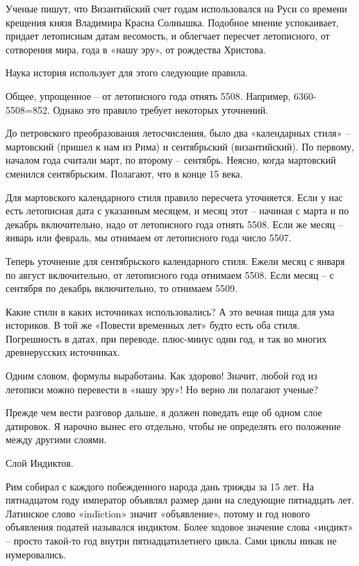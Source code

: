 Ученые пишут, что Византийский счет годам использовался на Руси со времени крещения князя Владимира Красна Солнышка. Подобное мнение успокаивает, придает летописным датам весомость, и облегчает пересчет летописного, от сотворения мира, года в «нашу эру», от рождества Христова.

Наука история использует для этого следующие правила.

Общее, упрощенное – от летописного года отнять 5508. Например, 6360-5508=852. Однако это правило требует некоторых уточнений.

До петровского преобразования летосчисления, было два «календарных стиля» – мартовский (пришел к нам из Рима) и сентябрьский (византийский). По первому, началом года считали март, по второму – сентябрь. Неясно, когда мартовский сменился сентябрьским. Полагают, что в конце 15 века.

Для мартовского календарного стиля правило пересчета уточняется. Если у нас есть летописная дата с указанным месяцем, и месяц этот – начиная с марта и по декабрь включительно, надо от летописного года отнять 5508. Если же месяц – январь или февраль, мы отнимаем от летописного года число 5507.

Теперь уточнение для сентябрьского календарного стиля. Ежели месяц с января по август включительно, от летописного года отнимаем 5508. Если месяц – с сентября по декабрь включительно, то отнимаем 5509.

Какие стили в каких источниках использовались? А это вечная пища для ума историков. В той же «Повести временных лет» будто есть оба стиля. Погрешность в датах, при переводе, плюс-минус один год, и так во многих древнерусских источниках.

Одним словом, формулы выработаны. Как здорово! Значит, любой год из летописи можно перевести в «нашу эру»! Но верно ли полагают ученые?

Прежде чем вести разговор дальше, я должен поведать еще об одном слое датировок. Я нарочно вынес его отдельно, чтобы не определять его положение между другими слоями.

Слой Индиктов.

Рим собирал с каждого побежденного народа дань трижды за 15 лет. На пятнадцатом году император объявлял размер дани на следующие пятнадцать лет. Латинское слово «indiction» значит «объявление», потому и год нового объявления податей назывался индиктом. Более ходовое значение слова «индикт» – просто такой-то год внутри пятнадцатилетнего цикла. Сами циклы никак не нумеровались.

